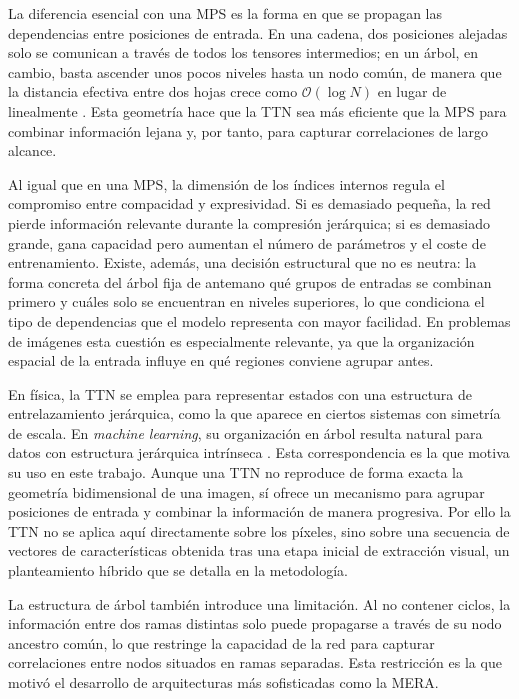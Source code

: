 La diferencia esencial con una MPS es la forma en que se propagan las dependencias entre posiciones de entrada. En una cadena, dos posiciones alejadas solo se comunican a través de todos los tensores intermedios; en un árbol, en cambio, basta ascender unos pocos niveles hasta un nodo común, de manera que la distancia efectiva entre dos hojas crece como $\mathcal{O}(\log N)$ en lugar de linealmente . Esta geometría hace que la TTN sea más eficiente que la MPS para combinar información lejana y, por tanto, para capturar correlaciones de largo alcance.

Al igual que en una MPS, la dimensión de los índices internos regula el compromiso entre compacidad y expresividad. Si es demasiado pequeña, la red pierde información relevante durante la compresión jerárquica; si es demasiado grande, gana capacidad pero aumentan el número de parámetros y el coste de entrenamiento. Existe, además, una decisión estructural que no es neutra: la forma concreta del árbol fija de antemano qué grupos de entradas se combinan primero y cuáles solo se encuentran en niveles superiores, lo que condiciona el tipo de dependencias que el modelo representa con mayor facilidad. En problemas de imágenes esta cuestión es especialmente relevante, ya que la organización espacial de la entrada influye en qué regiones conviene agrupar antes.

En física, la TTN se emplea para representar estados con una estructura de entrelazamiento jerárquica, como la que aparece en ciertos sistemas con simetría de escala. En \textit{machine learning}, su organización en árbol resulta natural para datos con estructura jerárquica intrínseca . Esta correspondencia es la que motiva su uso en este trabajo. Aunque una TTN no reproduce de forma exacta la geometría bidimensional de una imagen, sí ofrece un mecanismo para agrupar posiciones de entrada y combinar la información de manera progresiva. Por ello la TTN no se aplica aquí directamente sobre los píxeles, sino sobre una secuencia de vectores de características obtenida tras una etapa inicial de extracción visual, un planteamiento híbrido que se detalla en la metodología.

La estructura de árbol también introduce una limitación. Al no contener ciclos, la información entre dos ramas distintas solo puede propagarse a través de su nodo ancestro común, lo que restringe la capacidad de la red para capturar correlaciones entre nodos situados en ramas separadas. Esta restricción es la que motivó el desarrollo de arquitecturas más sofisticadas como la MERA.

